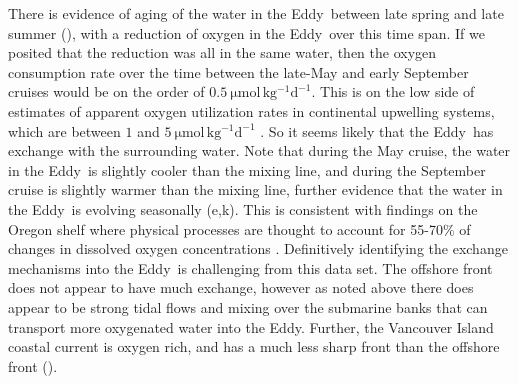 \documentclass[draft]{agujournal2019}
\newcommand*{\Eddy}{{\sc Eddy}}
\begin{document}
There is evidence of aging of the water in the \Eddy\ between late spring and late summer (), with a reduction of oxygen in the \Eddy\ over this time span.  If we posited that the reduction was all in the same water, then the oxygen consumption rate over the time between the late-May and early September cruises would be on the order of $0.5\ \mathrm{\mu mol\, kg^{-1} d^{-1}}$.  This is on the low side of estimates of apparent oxygen utilization rates in continental upwelling systems, which are between $1$ and $5\  \mathrm{\mu mol\, kg^{-1} d^{-1}}$ \cite{dortchetal94,connollyetal10}.   So it seems likely that the \Eddy\ has exchange with the surrounding water.  Note that during the May cruise, the water in the \Eddy\ is slightly cooler than the mixing line, and during the September cruise is slightly warmer than the mixing line, further evidence that the water in the \Eddy\ is evolving seasonally (e,k).  This is consistent with findings on the Oregon shelf where physical processes are thought to account for 55-70\% of changes in dissolved oxygen concentrations \cite{adamsetal13}.  Definitively identifying the exchange mechanisms into the \Eddy\ is challenging from this data set.  The offshore front does not appear to have much exchange, however as noted above there does appear to be strong tidal flows and mixing over the submarine banks that can transport more oxygenated water into the \Eddy.  Further, the Vancouver Island coastal current is oxygen rich, and has a much less sharp front than the offshore front ().
\end{document}
